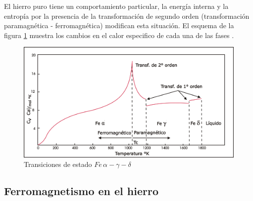 El hierro puro tiene un comportamiento particular, la energía interna y la entropía por la presencia de la transformación de segundo orden (transformación paramagnética - ferromagnética) modifican esta situación. El
esquema de la figura \ref{fig:particularidadFe2} muestra los cambios en el calor especifico de cada una de las fases \citep{CpFe}.

\begin{figure}[H]
    \centering
    \includegraphics[width=1.0\textwidth]{./Figures/particularidadFe2}
	\caption{Transiciones de estado $Fe\,\alpha-\gamma-\delta$}
	\label{fig:particularidadFe2}
\end{figure}

\subsection{Ferromagnetismo en el hierro}


